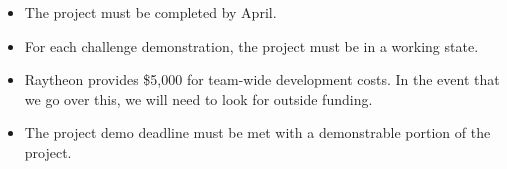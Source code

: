 
\begin{itemize}
  \item The project must be completed by April.
  \item For each challenge demonstration, the project must be in a working state.
  \item Raytheon provides \$5,000 for team-wide development costs. In the event that we go over this, we will need to look for outside funding.
  \item The project demo deadline must be met with a demonstrable portion of the project.
\end{itemize}